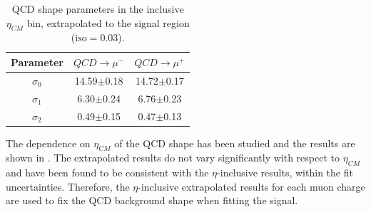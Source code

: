 \begin{table}[htbp]
  \begin{center}
  \begin{tabular}{|c|c|c|}\hline
  Parameter & $QCD \to \mu^{-}$ & $QCD \to \mu^{+}$ \\\hline
  $\sigma_{0}$ & 14.59$\pm$0.18 & 14.72$\pm$0.17 \\\hline
  $\sigma_{1}$ & 6.30$\pm$0.24 & 6.76$\pm$0.23 \\\hline
  $\sigma_{2}$ & 0.49$\pm$0.15 & 0.47$\pm$0.13 \\\hline
  \end{tabular}
  \end{center}
  \caption{QCD shape parameters in the inclusive $\eta_{CM}$ bin, extrapolated to the signal region ($\text{iso} = 0.03$).}
  \label{tab:QCD_Extrapolation}
\end{table}

The dependence on $\eta_{CM}$ of the QCD shape has been studied and the results are shown in . The extrapolated results do not vary significantly with respect to $\eta_{CM}$ and have been found to be consistent with the $\eta$-inclusive results, within the fit uncertainties. Therefore, the $\eta$-inclusive extrapolated results for each muon charge are used to fix the QCD background shape when fitting the signal.

